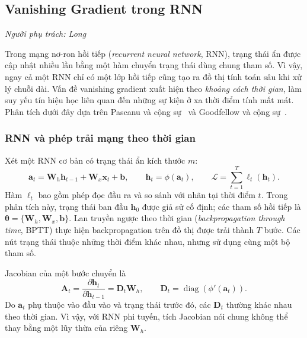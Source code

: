 \documentclass[12pt]{article}
\begin{document}
\subsection{Vanishing Gradient trong RNN}
\label{sec:long-rnn}
\textit{Người phụ trách: Long}

Trong mạng nơ-ron hồi tiếp (\textit{recurrent neural network}, RNN), trạng thái ẩn được cập nhật nhiều lần bằng một hàm chuyển trạng thái dùng chung tham số. Vì vậy, ngay cả một RNN chỉ có một lớp hồi tiếp cũng tạo ra đồ thị tính toán sâu khi xử lý chuỗi dài. Vấn đề vanishing gradient xuất hiện theo \emph{khoảng cách thời gian}, làm suy yếu tín hiệu học liên quan đến những sự kiện ở xa thời điểm tính mất mát. Phân tích dưới đây dựa trên Pascanu và cộng sự~\cite[\S1.1--2.1]{long-pascanu2013} và Goodfellow và cộng sự~\cite[\S8.2.5, \S10.7]{long-goodfellow2016}.

\subsubsection{RNN và phép trải mạng theo thời gian}
Xét một RNN cơ bản có trạng thái ẩn kích thước $m$:
\begin{equation}
 \mathbf a_t=\mathbf W_h\mathbf h_{t-1}+\mathbf W_x\mathbf x_t+\mathbf b,
 \qquad \mathbf h_t=\phi(\mathbf a_t),\qquad
 \mathcal L=\sum_{t=1}^{T}\ell_t(\mathbf h_t).
 \label{eq:long-rnn-model}
\end{equation}
Hàm $\ell_t$ bao gồm phép đọc đầu ra và so sánh với nhãn tại thời điểm $t$. Trong phân tích này, trạng thái ban đầu $\mathbf h_0$ được giả sử cố định; các tham số hồi tiếp là $\boldsymbol\theta=\{\mathbf W_h,\mathbf W_x,\mathbf b\}$. Lan truyền ngược theo thời gian (\textit{backpropagation through time}, BPTT) thực hiện backpropagation trên đồ thị được trải thành $T$ bước. Các nút trạng thái thuộc những thời điểm khác nhau, nhưng sử dụng cùng một bộ tham số.

Jacobian của một bước chuyển là
\begin{equation}
 \mathbf A_t=\frac{\partial\mathbf h_t}{\partial\mathbf h_{t-1}}
 =\mathbf D_t\mathbf W_h,\qquad
 \mathbf D_t=\operatorname{diag}\!\left(\phi'(\mathbf a_t)\right).
 \label{eq:long-rnn-jac}
\end{equation}
Do $\mathbf a_t$ phụ thuộc vào đầu vào và trạng thái trước đó, các $\mathbf D_t$ thường khác nhau theo thời gian. Vì vậy, với RNN phi tuyến, tích Jacobian nói chung không thể thay bằng một lũy thừa của riêng $\mathbf W_h$.
\end{document}
